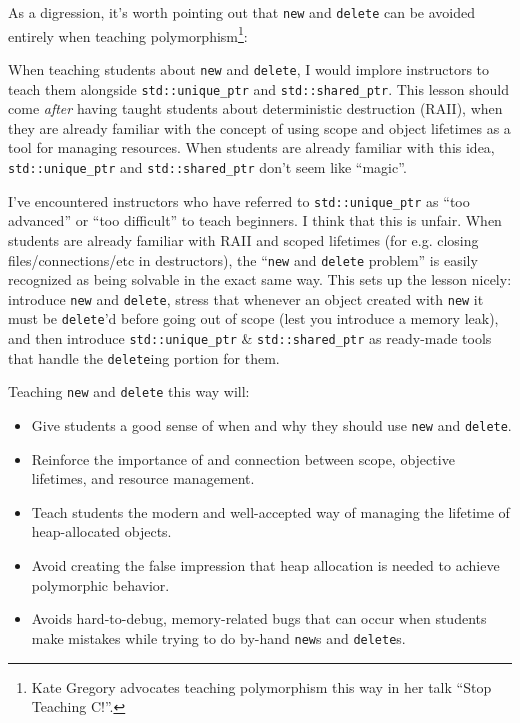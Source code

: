 \documentclass{article}
\newcommand{\codefromfile}[1]{
	
}
\newcommand{\CppNew}{\lstinline{new}}
\newcommand{\CppDelete}{\lstinline{delete}}
\newcommand{\NewAndDelete}{\CppNew{} and \CppDelete{}}
\begin{document}
As a digression, it's worth pointing out that \NewAndDelete{} can be avoided entirely when teaching polymorphism\footnote{Kate Gregory advocates teaching polymorphism this way in her talk ``Stop Teaching C!''.}:

\begin{figure}[h]
	\centering
	\codefromfile{code/polymorphism-no-pointers.cpp}
\end{figure}

When teaching students about \NewAndDelete{}, I would implore instructors to teach them alongside \lstinline{std::unique_ptr} and \lstinline{std::shared_ptr}.  This lesson should come \emph{after} having taught students about deterministic destruction (RAII), when they are already familiar with the concept of using scope and object lifetimes as a tool for managing resources.  When students are already familiar with this idea, \lstinline{std::unique_ptr} and \lstinline{std::shared_ptr} don't seem like ``magic''.  

I've encountered instructors who have referred to \lstinline{std::unique_ptr} as ``too advanced'' or ``too difficult'' to teach beginners.  I think that this is unfair.  When students are already familiar with RAII and scoped lifetimes (for e.g. closing files/connections/etc in destructors), the ``\NewAndDelete{} problem'' is easily recognized as being solvable in the exact same way.  This sets up the lesson nicely: introduce \NewAndDelete{}, stress that whenever an object created with \CppNew{} it must be \CppDelete{}'d before going out of scope (lest you introduce a memory leak), and then introduce \lstinline{std::unique_ptr} \& \lstinline{std::shared_ptr} as ready-made tools that handle the \CppDelete{}ing portion for them. 

Teaching \NewAndDelete{} this way will: 
\begin{itemize}
\item Give students a good sense of when and why they should use \NewAndDelete{}.
\item Reinforce the importance of and connection between scope, objective lifetimes, and resource management.
\item Teach students the modern and well-accepted way of managing the lifetime of heap-allocated objects. 
\item Avoid creating the false impression that heap allocation is needed to achieve polymorphic behavior.
\item Avoids hard-to-debug, memory-related bugs that can occur when students make mistakes while trying to do by-hand \CppNew{}s and \CppDelete{}s.
\end{itemize}
\end{document}
